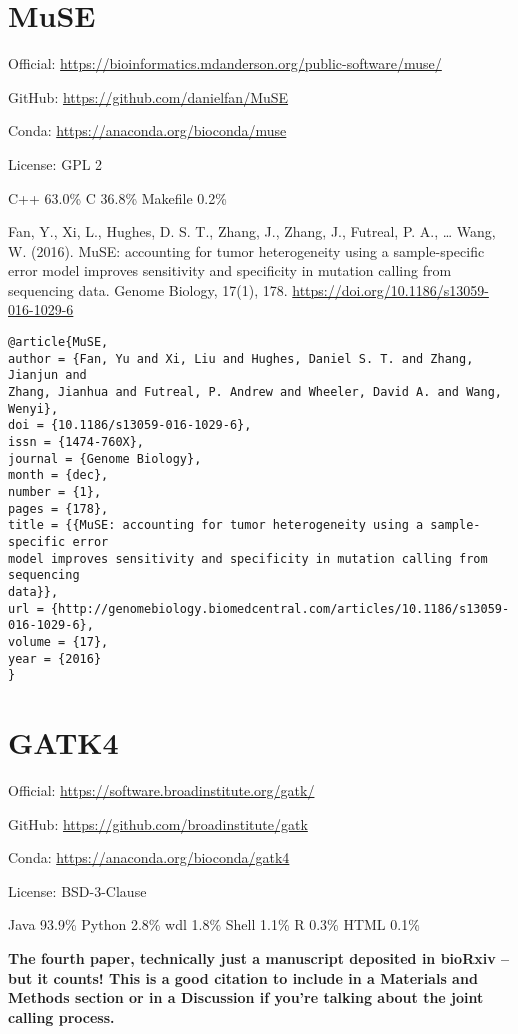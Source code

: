 \documentclass[]{article}
\begin{document}
\section{MuSE}

Official: \url{https://bioinformatics.mdanderson.org/public-software/muse/}

GitHub: \url{https://github.com/danielfan/MuSE}

Conda: \url{https://anaconda.org/bioconda/muse}

License: GPL 2

C++ 63.0\% C 36.8\% Makefile 0.2\%


Fan, Y., Xi, L., Hughes, D. S. T., Zhang, J., Zhang, J., Futreal, P. A., … Wang, W. (2016). MuSE: accounting for tumor heterogeneity using a sample-specific error model improves sensitivity and specificity in mutation calling from sequencing data. Genome Biology, 17(1), 178. \url{https://doi.org/10.1186/s13059-016-1029-6}

\begin{verbatim}
@article{MuSE,
author = {Fan, Yu and Xi, Liu and Hughes, Daniel S. T. and Zhang, Jianjun and
Zhang, Jianhua and Futreal, P. Andrew and Wheeler, David A. and Wang, Wenyi},
doi = {10.1186/s13059-016-1029-6},
issn = {1474-760X},
journal = {Genome Biology},
month = {dec},
number = {1},
pages = {178},
title = {{MuSE: accounting for tumor heterogeneity using a sample-specific error
model improves sensitivity and specificity in mutation calling from sequencing
data}},
url = {http://genomebiology.biomedcentral.com/articles/10.1186/s13059-016-1029-6},
volume = {17},
year = {2016}
}
\end{verbatim}

\section{GATK4}

Official: \url{https://software.broadinstitute.org/gatk/}

GitHub: \url{https://github.com/broadinstitute/gatk}

Conda: \url{https://anaconda.org/bioconda/gatk4}

License: BSD-3-Clause

Java 93.9\% Python 2.8\% wdl 1.8\% Shell 1.1\% R 0.3\% HTML 0.1\%


\textbf{The fourth paper, technically just a manuscript deposited in bioRxiv -- but it counts! This is a good citation to include in a Materials and Methods section or in a Discussion if you're talking about the joint calling process.}
\end{document}
